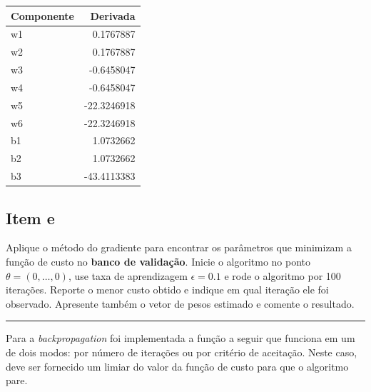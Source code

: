 \documentclass[
  a4paperpaper,
]{article}
\begin{document}
\begin{longtable}[]{@{}lr@{}}
\toprule\noalign{}
Componente & Derivada \\
\midrule\noalign{}
\endhead
\bottomrule\noalign{}
\endlastfoot
w1 & 0.1767887 \\
w2 & 0.1767887 \\
w3 & -0.6458047 \\
w4 & -0.6458047 \\
w5 & -22.3246918 \\
w6 & -22.3246918 \\
b1 & 1.0732662 \\
b2 & 1.0732662 \\
b3 & -43.4113383 \\
\end{longtable}

\subsection{Item e}\label{item-e}

Aplique o método do gradiente para encontrar os parâmetros que minimizam
a função de custo no \textbf{banco de validação}. Inicie o algoritmo no
ponto \(\theta = (0, \dots , 0)\), use taxa de aprendizagem
\(\epsilon = 0.1\) e rode o algoritmo por 100 iterações. Reporte o menor
custo obtido e indique em qual iteração ele foi observado. Apresente
também o vetor de pesos estimado e comente o resultado.

\begin{center}\rule{0.5\linewidth}{0.5pt}\end{center}

Para a \emph{backpropagation} foi implementada a função a seguir que
funciona em um de dois modos: por número de iterações ou por critério de
aceitação. Neste caso, deve ser fornecido um limiar do valor da função
de custo para que o algoritmo pare.
\end{document}
